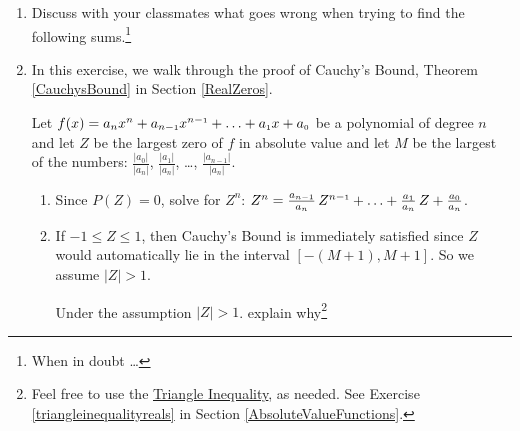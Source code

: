 \documentclass{ximera}
\begin{document}
\begin{enumerate}
\item  Discuss with your classmates what goes wrong when trying to find the following sums.\footnote{When in doubt \ldots }


\begin{enumerate}


\end{enumerate}


\item  \label{CauchyBoundProofExercise}  In this exercise, we walk through the proof of Cauchy's Bound, Theorem \ref{CauchysBound} in Section \ref{RealZeros}.  

\smallskip

Let $f(x) = a_{n} x^{n} + a_{n-\mbox{\tiny$1$}}x^{n-\mbox{\tiny$1$}} + \ldots + a_{\mbox{\tiny$1$}} x + a_{\mbox{\tiny$0$}}$ be a polynomial of degree $n$ and let $Z$ be the largest zero of $f$ in absolute value and let $M$ be the largest of the numbers: $\frac{|a_{0}|}{|a_{n}|}$, $\frac{|a_{1}|}{|a_{n}|}$, \ldots, $\frac{|a_{n-1}|}{|a_{n}|}$.

\begin{enumerate}

\item  Since $P(Z) = 0$, solve for $Z^{n}$:   $Z^{n} = \frac{a_{n-\mbox{\tiny$1$}}}{a_{n}} \, Z^{n-\mbox{\tiny$1$}} + \ldots + \frac{a_{\mbox{\tiny$1$}}}{a_{n}} \,  Z + \frac{a_{\mbox{\tiny$0$}}}{a_{n}}$.

\item  If $-1 \leq Z \leq 1$, then Cauchy's Bound is immediately satisfied since $Z$ would automatically lie in the interval $\left[-(M+1), M+1\right]$. So we assume $|Z|>1$.  

\smallskip

Under the assumption $|Z|>1$. explain why\footnote{Feel free to use the \href{http://en.wikipedia.org/wiki/Triangle_inequality}{\underline{Triangle Inequality}}, as needed.  See Exercise \ref{triangleinequalityreals} in Section \ref{AbsoluteValueFunctions}.} 


\end{enumerate}
\end{enumerate}
\end{document}
